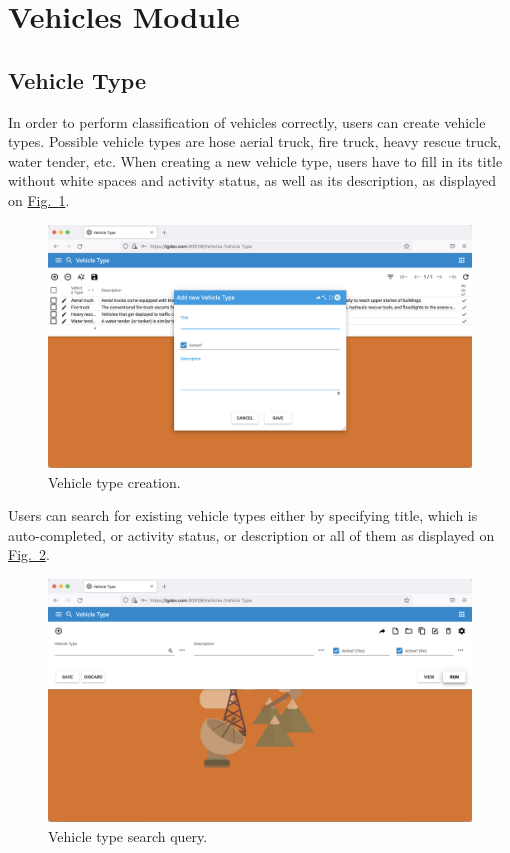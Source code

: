 \section{Vehicles Module}\label{sec:01}

\subsection{Vehicle Type}

In order to perform classification of vehicles correctly, users can create vehicle types. Possible vehicle types are hose aerial truck, fire truck, heavy rescue truck, water tender, etc. When creating a new vehicle type, users have to fill in its title without white spaces and activity status, as well as its description, as displayed on \hyperref[sections/vehicles/images/20]{Fig.~\ref*{sections/vehicles/images/20}}. 

    \begin{figure}[!htbp]
	\centering
	\includegraphics[width=0.95\linewidth]{sections/vehicles/images/20.png}
	\caption{Vehicle type creation.}\label{sections/vehicles/images/20}
	\end{figure}

\newpage
Users can search for existing vehicle types either by specifying title, which is auto-completed, or activity status, or description or all of them as displayed on
\hyperref[sections/vehicles/images/21]{Fig.~\ref*{sections/vehicles/images/21}}.

    \begin{figure}[!htbp]
	\centering
	\includegraphics[width=0.95\linewidth]{sections/vehicles/images/21.png}
	\caption{Vehicle type search query.}\label{sections/vehicles/images/21}
	\end{figure}
	
